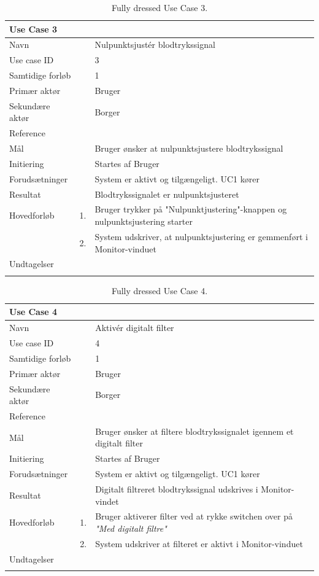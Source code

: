 \begin{longtabu} to  %
    {\large \textbf{Use Case 3}} && \\
    \toprule
    Navn &&    Nulpunktsjustér blodtrykssignal\\
    Use case ID &&    3\\
    Samtidige forløb &&    1\\
    Primær aktør &&    Bruger\\
    Sekundære aktør &&	Borger \\
    Reference &&      \\
    Mål &&    Bruger ønsker at nulpunktsjustere blodtrykssignal\\
    Initiering &&	Startes af Bruger\\
    Forudsætninger &&  System er aktivt og tilgængeligt. UC1 kører \\    Resultat &&		Blodtrykssignalet er nulpunktsjusteret\\ \midrule
    Hovedforløb &    1. &    Bruger trykker på "Nulpunktjustering"\--knappen og nulpunktsjustering starter\\[-1ex]   						 	
                &    2. &    System udskriver, at nulpunktsjustering er gemmenført i Monitor-vinduet\newline\\ \midrule
                
    Undtagelser &     &      \\ \bottomrule
\caption{Fully dressed Use Case 3.}
\label{UC3}
\end{longtabu}

\begin{longtabu} to  %
    {\large \textbf{Use Case 4}} && \\
    \toprule
    Navn &&    Aktivér digitalt filter\\
    Use case ID &&    4\\
    Samtidige forløb &&   1\\
    Primær aktør &&    Bruger\\
    Sekundære aktør &&	Borger \\
    Reference &&      \\
    Mål &&    Bruger ønsker at filtere blodtrykssignalet igennem et digitalt filter\\
    Initiering &&	Startes af Bruger\\
    Forudsætninger &&  System er aktivt og tilgængeligt. UC1 kører  \\
    Resultat &&		Digitalt filtreret blodtrykssignal udskrives i Monitor-vindet                 \\ \midrule
    Hovedforløb &    1. &    Bruger aktiverer filter ved at rykke switchen over på \textit{"Med digitalt filtre"} \\[-1ex]   						 	
                &    2. &    System udskriver at filteret er aktivt i Monitor-vinduet\newline\\ \midrule
                
    Undtagelser &     &      \\ \bottomrule
\caption{Fully dressed Use Case 4.}
\label{UC4}
\end{longtabu}

